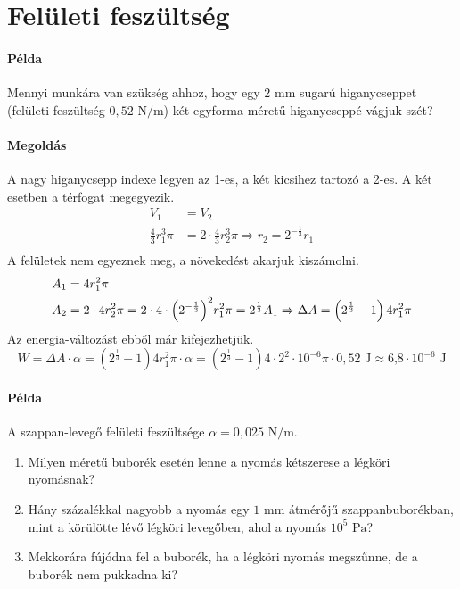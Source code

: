 \documentclass[12pt,a4paper]{scrartcl}
\begin{document}
\section{Felületi feszültség}
\footnotesize
\paragraph{Példa}
Mennyi munkára van szükség ahhoz, hogy egy $2\text{ mm}$ sugarú higanycseppet (felületi feszültség $0{,}52\text{ N}/\text{m}$) két egyforma méretű higanycseppé vágjuk szét?

\paragraph{Megoldás}
A nagy higanycsepp indexe legyen az 1-es, a két kicsihez tartozó a 2-es. A két esetben a térfogat megegyezik.
\[\begin{aligned}
  {V_1} &  = {V_2} \\ 
  \frac{4}{3}r_1^3\pi  &  = 2 \cdot \frac{4}{3}r_2^3\pi  \Rightarrow {r_2} = {2^{ - \frac{1}{3}}}{r_1} \\ 
\end{aligned} \]
A felületek nem egyeznek meg, a növekedést akarjuk kiszámolni.
\[\begin{gathered}
  {A_1} = 4r_1^2\pi  \hfill \\
  {A_2} = 2 \cdot 4r_2^2\pi  = 2 \cdot 4 \cdot {\left( {{2^{ - \frac{1}{3}}}} \right)^2}r_1^2\pi  = {2^{\frac{1}{3}}}{A_1} \Rightarrow \Delta A = \left( {{2^{\frac{1}{3}}} - 1} \right)4r_1^2\pi  \hfill \\ 
\end{gathered} \]
Az energia-változást ebből már kifejezhetjük.
\[W = \Delta A \cdot \alpha  = \left( {{2^{\frac{1}{3}}} - 1} \right)4r_1^2\pi  \cdot \alpha  = \left( {{2^{\frac{1}{3}}} - 1} \right)4 \cdot {2^2} \cdot {10^{ - 6}}\pi  \cdot 0{,}52{\text{ J}} \approx {\text{6{,}8}} \cdot {\text{1}}{{\text{0}}^{ - 6}}{\text{ J}}\]
\paragraph{Példa}
A szappan-levegő felületi feszültsége $\alpha = 0{,}025\text{ N}/\text{m}$. 
\begin{enumerate}
\item  Milyen méretű buborék esetén lenne a nyomás kétszerese a légköri nyomásnak? 
\item Hány százalékkal nagyobb a nyomás egy $1\text{ mm}$ átmérőjű szappanbuborékban, mint a körülötte lévő légköri levegőben, ahol a nyomás $10^5\text{ Pa}$?
\item Mekkorára fújódna fel a buborék, ha a légköri nyomás megszűnne, de a buborék nem pukkadna ki?
\end{enumerate}
\end{document}

